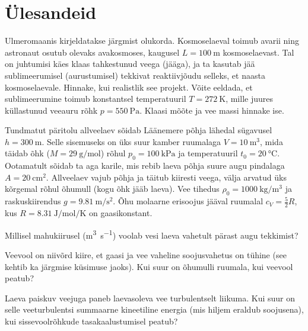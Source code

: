 \documentclass[a4paper,11pt,twocolumn]{article}
\begin{document}
\section{Ülesandeid}

\begin{question}
	Ulmeromaanis kirjeldatakse järgmist olukorda. Kosmoselaeval toimub avarii ning astronaut osutub olevaks avakosmoses, kaugusel \( L = \SI{100}{\m} \) kosmoselaevast. Tal on juhtumisi käes klaas tahkestunud veega (jääga), ja ta kasutab jää sublimeerumisel (aurustumisel) tekkivat reaktiivjõudu selleks, et naasta kosmoselaevale. Hinnake, kui realistlik see projekt. Võite eeldada, et sublimeerumine toimub konstantsel temperatuuril \( T = \SI{272}{\K} \), mille juures küllastunud veeauru rõhk \( p = \SI{550}{\Pa} \). Klaasi mõõte ja vee massi hinnake ise.
\end{question}
\begin{question}[NBPhO 2018, P8]
Tundmatut päritolu allveelaev sõidab Läänemere põhja lähedal sügavusel \( h = \SI{300}{\m} \). Selle sisemuseks on üks suur kamber ruumalaga \( V = \SI{10}{\m\tothe{3}} \), mida täidab õhk (\( M = \SI{29}{\g\per\mol} \)) rõhul \( p_0 = \SI{100}{\kPa} \) ja temperatuuril \( t_0 = \SI{20}{\degreeCelsius} \). Ootamatult sõidab ta aga karile, mis rebib laeva põhja suure augu pindalaga \( A = \SI{20}{\cm\squared}\). Allveelaev vajub põhja ja täitub kiiresti veega, välja arvatud üks kõrgemal rõhul õhumull (kogu õhk jääb laeva). Vee tihedus \( \rho_0 = \SI{1000}{\kg\per\m\cubed} \) ja raskuskiirendus \( g =\SI{9,81}{\m\per\s\squared} \). Õhu molaarne erisoojus jääval ruumalal \( c_V =\frac{5}{2}R \), kus \( R = \SI{8,31}{\J\per\mol\per\K}  \) on gaasikonstant.
\begin{subquestion}
	\item Millisel mahukiirusel (\si{\m\cubed\per\s}) voolab vesi laeva vahetult pärast augu tekkimist?
	\item Veevool on niivõrd kiire, et gaasi ja vee vaheline soojusvahetus on tühine (see kehtib ka järgmise küsimuse jaoks). Kui suur on õhumulli ruumala, kui veevool peatub?
	\item Laeva paiskuv veejuga paneb laevasoleva vee turbulentselt liikuma. Kui suur on selle veeturbulentsi summaarne kineetiline energia (mis hiljem eraldub soojusena), kui sissevoolrõhkude tasakaalustumisel peatub?
\end{subquestion}
\end{question}
\end{document}
